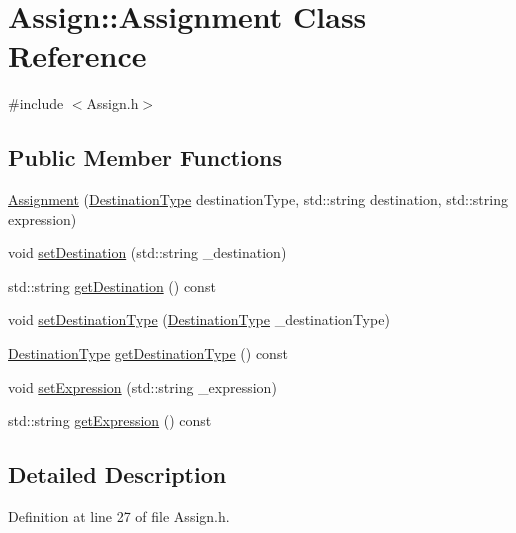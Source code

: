 \hypertarget{class_assign_1_1_assignment}{\section{Assign\-:\-:Assignment Class Reference}
\label{class_assign_1_1_assignment}
}


{\ttfamily \#include $<$Assign.\-h$>$}

\subsection*{Public Member Functions}
\begin{DoxyCompactItemize}
\item 
\hyperlink{class_assign_1_1_assignment_a41583f4bbce99b1d95f4ef067c236f7a}{Assignment} (\hyperlink{class_assign_ae0f42117c12a8d0bc2bf0b7574070694}{Destination\-Type} destination\-Type, std\-::string destination, std\-::string expression)
\item 
void \hyperlink{class_assign_1_1_assignment_a8d0c9b18c0b1258bba905b4e47a2659b}{set\-Destination} (std\-::string \-\_\-destination)
\item 
std\-::string \hyperlink{class_assign_1_1_assignment_a6cf7ecd2950dfc709985a1ede3773be8}{get\-Destination} () const 
\item 
void \hyperlink{class_assign_1_1_assignment_a9688ea3171c85ccbcdf0ed9d87ad9cc7}{set\-Destination\-Type} (\hyperlink{class_assign_ae0f42117c12a8d0bc2bf0b7574070694}{Destination\-Type} \-\_\-destination\-Type)
\item 
\hyperlink{class_assign_ae0f42117c12a8d0bc2bf0b7574070694}{Destination\-Type} \hyperlink{class_assign_1_1_assignment_a46493b98c1cd97ce4b015640bf34dd27}{get\-Destination\-Type} () const 
\item 
void \hyperlink{class_assign_1_1_assignment_aa36ca609362d3deedffbefd9cceb12e6}{set\-Expression} (std\-::string \-\_\-expression)
\item 
std\-::string \hyperlink{class_assign_1_1_assignment_a724dc03a686c4d53d57ee45b7617ae2f}{get\-Expression} () const 
\end{DoxyCompactItemize}


\subsection{Detailed Description}


Definition at line 27 of file Assign.\-h.




